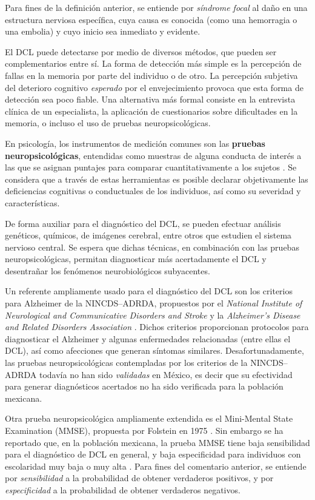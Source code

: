 \documentclass[12pt,letterpaper]{book}
\begin{document}
Para fines de la definición anterior, se entiende por \textit{síndrome focal} al daño en una estructura nerviosa específica, cuya causa es conocida (como una hemorragia o una embolia) y cuyo inicio sea inmediato y evidente. 

El DCL puede detectarse por medio de diversos métodos, que pueden ser complementarios entre sí. 
%
La forma de detección más simple es la percepción de fallas en la memoria por parte del individuo o de otro. 
%
La percepción subjetiva del deterioro cognitivo \textit{esperado} por el envejecimiento provoca que esta forma de detección sea poco fiable.
%
Una alternativa más {formal} consiste en la entrevista clínica de un especialista, la aplicación de cuestionarios sobre dificultades en la memoria, o incluso el uso de pruebas neuropsicológicas. 

En psicología, los instrumentos de medición comunes son las \textbf{pruebas neuropsicológicas}, 
entendidas como muestras de alguna conducta de interés a las que se asignan puntajes para comparar 
cuantitativamente a los sujetos \cite{Ardila12}.
%
Se considera que a través de estas herramientas es posible declarar objetivamente las deficiencias cognitivas o conductuales de los individuos, así como su severidad y características.

De forma auxiliar para el diagnóstico del DCL, se pueden efectuar análisis genéticos, químicos, de imágenes cerebral, entre otros que estudien el sistema nervioso central.
%
Se espera que dichas técnicas, en combinación con las pruebas neuropsicológicas, permitan diagnosticar más acertadamente el DCL y desentrañar los fenómenos neurobiológicos subyacentes.

Un referente ampliamente usado para el diagnóstico del DCL son los criterios para Alzheimer de la NINCDS--ADRDA, propuestos %
por el \textit{National Institute of Neurological and Communicative Disorders and Stroke} y la \textit{Alzheimer's Disease and Related Disorders Association} 
\cite{Dubois07}. 
%
Dichos criterios proporcionan protocolos para diagnosticar el Alzheimer y algunas enfermedades relacionadas (entre ellas el DCL), así como afecciones que generan síntomas similares. 
%
Desafortunadamente, las pruebas neuropsicológicas contempladas por los criterios de la NINCDS--ADRDA todavía no han sido \textit{validadas} en México, es decir que su efectividad para generar diagnósticos acertados no ha sido verificada para la población mexicana. 

Otra prueba neuropsicológica ampliamente extendida es el Mini-Mental State Examination (MMSE), propuesta por Folstein en 1975 \cite{folstein75}. %
%
Sin embargo se ha reportado que, en la población mexicana, la prueba MMSE tiene baja sensibilidad para el diagnóstico de DCL en general, y baja especificidad para individuos con escolaridad muy baja o muy alta \cite{Ostrosky00}.
%
Para fines del comentario anterior, se entiende por \textit{sensibilidad} a la probabilidad de obtener verdaderos positivos, y por \textit{especificidad} a la probabilidad de obtener verdaderos negativos.
\end{document}
